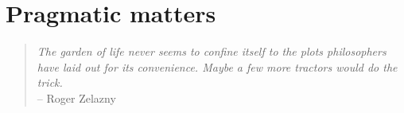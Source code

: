 



\chapter{Pragmatic matters~\label{ch:datahandling}}

\begin{quote}
{\it The garden of life never seems to confine itself to the plots philosophers have
laid out for its convenience. Maybe a few more tractors would do the trick.} \\ \hspace*{2cm} -- Roger Zelazny
\end{quote}


